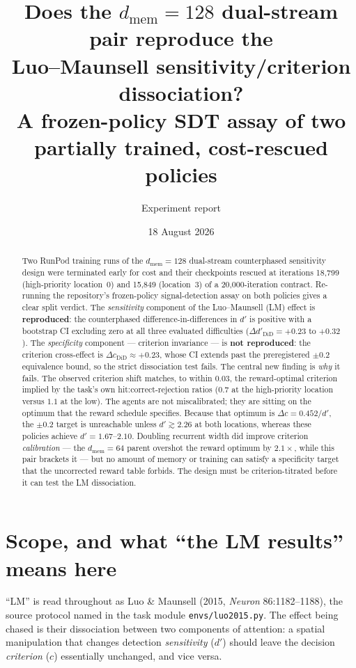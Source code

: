 \documentclass[11pt]{article}
\title{\vspace{-1.2cm}\textbf{Does the $d_{\mathrm{mem}}{=}128$ dual-stream pair reproduce the\\
Luo--Maunsell sensitivity/criterion dissociation?}\\[2mm]
\large A frozen-policy SDT assay of two partially trained, cost-rescued policies}
\author{Experiment report}
\date{18 August 2026}
\newcommand{\yes}{\textcolor{good}{\textbf{reproduced}}}
\newcommand{\no}{\textcolor{bad}{\textbf{not reproduced}}}
\newcommand{\dprime}{d'}
\newcommand{\dd}{\Delta d'}
\newcommand{\dc}{\Delta c}
\begin{document}
\maketitle
\vspace{-0.7cm}

\begin{abstract}
\noindent Two RunPod training runs of the $d_{\mathrm{mem}}{=}128$ dual-stream
counterphased sensitivity design were terminated early for cost and their
checkpoints rescued at iterations 18{,}799 (high-priority location~0) and 15{,}849
(location~3) of a 20{,}000-iteration contract. Re-running the repository's frozen-policy
signal-detection assay on both policies gives a clear split verdict. The
\emph{sensitivity} component of the Luo--Maunsell (LM) effect is \yes: the counterphased
difference-in-differences in $\dprime$ is positive with a bootstrap CI excluding zero at
all three evaluated difficulties ($\dd_{\mathrm{DiD}} = +0.23$ to $+0.32$). The
\emph{specificity} component --- criterion invariance --- is \no: the criterion
cross-effect is $\dc_{\mathrm{DiD}} \approx +0.23$, whose CI extends past the
preregistered $\pm 0.2$ equivalence bound, so the strict dissociation test fails.
The central new finding is \emph{why} it fails. The observed criterion shift matches,
to within $0.03$, the reward-optimal criterion implied by the task's own
hit:correct-rejection ratios ($0.7$ at the high-priority location versus $1.1$ at the
low). The agents are not miscalibrated; they are sitting on the optimum that the reward
schedule specifies. Because that optimum is $\dc = 0.452/\dprime$, the $\pm 0.2$ target
is unreachable unless $\dprime \gtrsim 2.26$ at both locations, whereas these policies
achieve $\dprime = 1.67$--$2.10$. Doubling recurrent width did improve criterion
\emph{calibration} --- the $d_{\mathrm{mem}}{=}64$ parent overshot the reward optimum by
$2.1\times$, while this pair brackets it --- but no amount of memory or training can
satisfy a specificity target that the uncorrected reward table forbids. The design must
be criterion-titrated before it can test the LM dissociation.
\end{abstract}

\section{Scope, and what ``the LM results'' means here}

``LM'' is read throughout as Luo \& Maunsell (2015, \emph{Neuron} 86:1182--1188), the
source protocol named in the task module \texttt{envs/luo2015.py}. The effect being
chased is their dissociation between two components of attention: a spatial manipulation
that changes detection \emph{sensitivity} ($\dprime$) should leave the decision
\emph{criterion} ($c$) essentially unchanged, and vice versa.
\end{document}
